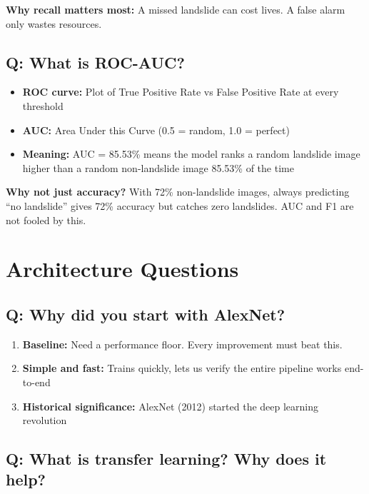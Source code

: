 \documentclass[11pt]{article}
\begin{document}
\textbf{Why recall matters most:} A missed landslide can cost lives. A false alarm only wastes resources.

\subsection{Q: What is ROC-AUC?}

\begin{itemize}[noitemsep]
    \item \textbf{ROC curve:} Plot of True Positive Rate vs False Positive Rate at every threshold
    \item \textbf{AUC:} Area Under this Curve (0.5 = random, 1.0 = perfect)
    \item \textbf{Meaning:} AUC = 85.53\% means the model ranks a random landslide image higher than a random non-landslide image 85.53\% of the time
\end{itemize}

\textbf{Why not just accuracy?} With 72\% non-landslide images, always predicting ``no landslide'' gives 72\% accuracy but catches zero landslides. AUC and F1 are not fooled by this.

\section{Architecture Questions}

\subsection{Q: Why did you start with AlexNet?}

\begin{enumerate}[noitemsep]
    \item \textbf{Baseline:} Need a performance floor. Every improvement must beat this.
    \item \textbf{Simple and fast:} Trains quickly, lets us verify the entire pipeline works end-to-end
    \item \textbf{Historical significance:} AlexNet (2012) started the deep learning revolution
\end{enumerate}

\subsection{Q: What is transfer learning? Why does it help?}
\end{document}
